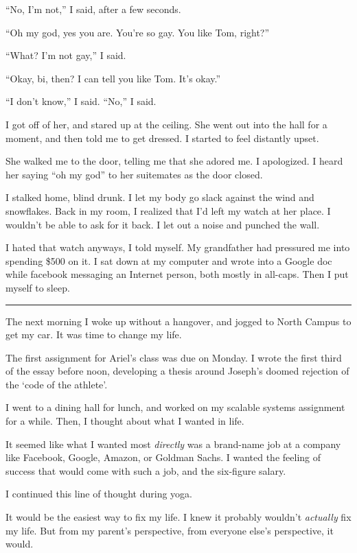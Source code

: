 ``No, I'm not,'' I said, after a few seconds.

``Oh my god, yes you are.  You're so gay.  You like Tom, right?''

``What?  I'm not gay,'' I said.

``Okay, bi, then?  I can tell you like Tom.  It's okay.''

``I don't know,'' I said.  ``No,'' I said.

I got off of her, and stared up at the ceiling.  She went out into the hall for
a moment, and then told me to get dressed.  I started to feel distantly upset.

She walked me to the door, telling me that she adored me.  I apologized.  I
heard her saying ``oh my god'' to her suitemates as the door closed. 

I stalked home, blind drunk.  I let my body go slack against the wind and
snowflakes.  Back in my room, I realized that I'd left my watch at her place.  I
wouldn't be able to ask for it back.  I let out a noise and punched the wall. 

I hated that watch anyways, I told myself.  My grandfather had pressured me into
spending \$500 on it.   I sat down at my computer and wrote into a Google doc
while facebook messaging an Internet person, both mostly in all-caps.  Then I
put myself to sleep.

\plainfancybreak{12pt}{2}{}

The next morning I woke up without a hangover, and jogged to North Campus to get
my car.  It was time to change my life.

The first assignment for Ariel's class was due on Monday.  I wrote the first
third of the essay before noon, developing a thesis around Joseph's doomed
rejection of the `code of the athlete'.

I went to a dining hall for lunch, and worked on my scalable systems assignment
for a while.  Then, I thought about what I wanted in life.

It seemed like what I wanted most \textit{directly} was a brand-name job at a
company like Facebook, Google, Amazon, or Goldman Sachs.  I wanted the feeling
of success that would come with such a job, and the six-figure salary.  

I continued this line of thought during yoga.

It would be the easiest way to fix my life.  I knew it probably wouldn't
\textit{actually} fix my life.  But from my parent's perspective, from everyone
else's perspective, it would.  

